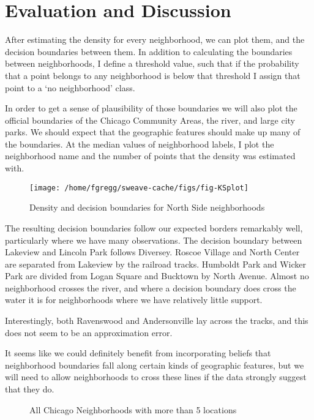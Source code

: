 \documentclass{article}
\begin{document}
\section{Evaluation and Discussion}
After estimating the density for every neighborhood, we can plot them,
and the decision boundaries between them. In addition to calculating
the boundaries between neighborhoods, I define a threshold value, such
that if the probability that a point belongs to any neighborhood is
below that threshold I assign that point to a `no neighborhood' class.

In order to get a sense of plausibility of those boundaries we will
also plot the official boundaries of the Chicago Community Areas, the
river, and large city parks. We should expect that the geographic
features should make up many of the boundaries. At the median values
of neighborhood labels, I plot the neighborhood name and the number of
points that the density was estimated with.




















\begin{figure}[h!]
  \centering

\texttt{[image: /home/fgregg/sweave-cache/figs/fig-KSplot]}
\caption{Density and decision boundaries for North Side neighborhoods}
\end{figure}

The resulting decision boundaries follow our expected borders
remarkably well, particularly where we have many observations. The
decision boundary between Lakeview and Lincoln Park follows
Diversey. Roscoe Village and North Center are separated from Lakeview
by the railroad tracks. Humboldt Park and Wicker Park are divided from
Logan Square and Bucktown by North Avenue. Almost no neighborhood
crosses the river, and where a decision boundary does cross the water
it is for neighborhoods where we have relatively little support.

Interestingly, both Ravenswood and Andersonville lay across the
tracks, and this does not seem to be an approximation error.

It seems like we could definitely benefit from incorporating beliefs
that neighborhood boundaries fall along certain kinds of geographic
features, but we will need to allow neighborhoods to cross these lines
if the data strongly suggest that they do.








\begin{figure}
  \centering

\caption{All Chicago Neighborhoods with more than 5 locations}
\end{figure}
\end{document}
